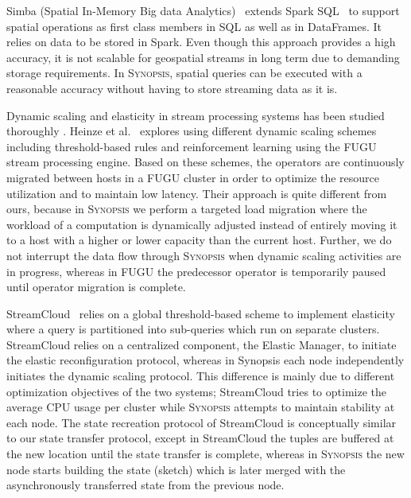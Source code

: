 Simba (Spatial In-Memory Big data Analytics)~\cite{xiesimba} extends Spark SQL~\cite{armbrust2015spark} to support spatial operations as first class members in SQL as well as in DataFrames. It relies on data to be stored in Spark. Even though this approach provides a high accuracy, it is not scalable for geospatial streams in long term due to demanding storage requirements. In \textsc{Synopsis}, spatial queries can be executed with a reasonable accuracy without having to store streaming data as it is.

Dynamic scaling and elasticity in stream processing systems has been studied thoroughly \cite{heinze2014auto, gulisano2012streamcloud, castro2013integrating, loesing2012stormy, heinze2013elastic, schneider2009elastic}.
Heinze et al.~\cite{heinze2014auto} explores using different dynamic scaling schemes including threshold-based rules and reinforcement learning using the FUGU~\cite{heinze2013elastic} stream processing engine.
Based on these schemes, the operators are continuously migrated between hosts in a FUGU cluster in order to optimize the resource utilization and to maintain low latency.
Their approach is quite different from ours, because in \textsc{Synopsis} we perform a targeted load migration where the workload of a computation is dynamically adjusted instead of entirely moving it to a host with a higher or lower capacity than the current host.
Further, we do not interrupt the data flow through \textsc{Synopsis} when dynamic scaling activities are in progress, whereas in FUGU the predecessor operator is temporarily paused until operator migration is complete. 

StreamCloud~\cite{gulisano2012streamcloud} relies on a global threshold-based scheme to implement elasticity where a query is partitioned into sub-queries which run on separate clusters.
StreamCloud relies on a centralized component, the Elastic Manager, to initiate the elastic reconfiguration protocol, whereas in Synopsis each node independently initiates the dynamic scaling protocol.
This difference is mainly due to different optimization objectives of the two systems; StreamCloud tries to optimize the average CPU usage per cluster while \textsc{Synopsis} attempts to maintain stability at each node.
The state recreation protocol of StreamCloud is conceptually similar to our state transfer protocol, except in StreamCloud the tuples are buffered at the new location until the state transfer is complete, whereas in \textsc{Synopsis} the new node starts building the state (sketch) which is later merged with the asynchronously transferred state from the previous node.

